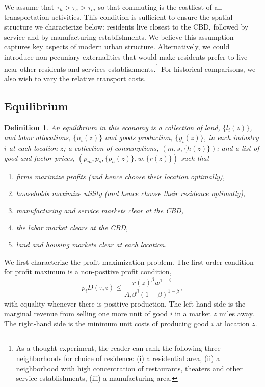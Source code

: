 \documentclass[12pt]{article}
\newtheorem{definition}{Definition}
\begin{document}
We assume that $\tau_h>\tau_s>\tau_m$ so that commuting is the costliest of all transportation activities. This condition is sufficient to ensure the spatial structure we characterize below: residents live closest to the CBD, followed by service and by manufacturing establishments. We believe this assumption captures key aspects of modern urban structure. Alternatively, we could introduce non-pecuniary externalities that would make residents prefer to live near other residents and services establishments.\footnote{As a thought experiment, the reader can rank the following three neighborhoods for choice of residence: (i) a residential area, (ii) a neighborhood with high concentration of restaurants, theaters and other service establishments, (iii) a manufacturing area.} For historical comparisons, we also wish to vary the relative transport costs.

\subsection{Equilibrium}
\begin{definition}
 An \emph{equilibrium} in this economy is a collection of land, $\{l_i(z)\}$, and labor allocations, $\{n_i(z)\}$ and goods production, $\{y_i(z)\}$, in each industry $i$ at each location $z$; a collection of consumptions, $(m,s,\{h(z)\})$; and a list of good and factor prices, $(p_m,p_s,\{p_h(z)\},w,\{r(z)\})$ such that
\begin{enumerate}
 \item firms maximize profits (and hence choose their location optimally),
 \item households maximize utility (and hence choose their residence optimally),
 \item manufacturing and service markets clear at the CBD,
 \item the labor market clears at the CBD,
 \item land and housing markets clear at each location.
\end{enumerate}
\end{definition}
We first characterize the profit maximization problem. The first-order condition for profit maximum is a non-positive profit condition,
\[
p_i D(\tau_i z) \le \frac{r(z)^\beta w^{1-\beta}}{A_i\beta^\beta (1-\beta)^{1-\beta}},
\]
with equality whenever there is positive production. The left-hand side is the marginal revenue from selling one more unit of good $i$ in a market $z$ miles away. The right-hand side is the minimum unit costs of producing good $i$ at location $z$.
\end{document}
